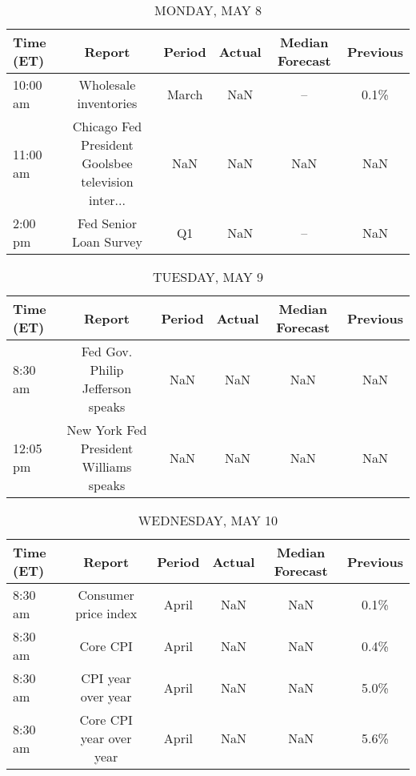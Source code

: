 \documentclass{article}%
\begin{document}
%
\normalsize%


\begin{table}[htbp]%
\caption{MONDAY, MAY 8}%
\centering%
\begin{adjustbox}{width=1\textwidth}%
\begin{tabular}{lccccc}
\toprule
Time (ET) &                                             Report & Period & Actual & Median Forecast & Previous \\
\midrule
 10:00 am &                              Wholesale inventories &  March &    NaN &              -- &     0.1\% \\
 11:00 am & Chicago Fed President Goolsbee television inter... &    NaN &    NaN &             NaN &      NaN \\
  2:00 pm &                             Fed Senior Loan Survey &     Q1 &    NaN &              -- &      NaN \\
\bottomrule
\end{tabular}
%
\end{adjustbox}%
\end{table}

%


\begin{table}[htbp]%
\caption{TUESDAY, MAY 9}%
\centering%
\begin{adjustbox}{width=1\textwidth}%
\begin{tabular}{lccccc}
\toprule
Time (ET) &                                 Report & Period & Actual & Median Forecast & Previous \\
\midrule
  8:30 am &       Fed Gov. Philip Jefferson speaks &    NaN &    NaN &             NaN &      NaN \\
 12:05 pm & New York Fed President Williams speaks &    NaN &    NaN &             NaN &      NaN \\
\bottomrule
\end{tabular}
%
\end{adjustbox}%
\end{table}

%


\begin{table}[htbp]%
\caption{WEDNESDAY, MAY 10}%
\centering%
\begin{adjustbox}{width=1\textwidth}%
\begin{tabular}{lccccc}
\toprule
Time (ET) &                  Report & Period & Actual & Median Forecast & Previous \\
\midrule
  8:30 am &    Consumer price index &  April &    NaN &             NaN &     0.1\% \\
  8:30 am &                Core CPI &  April &    NaN &             NaN &     0.4\% \\
  8:30 am &      CPI year over year &  April &    NaN &             NaN &     5.0\% \\
  8:30 am & Core CPI year over year &  April &    NaN &             NaN &     5.6\% \\
\bottomrule
\end{tabular}
%
\end{adjustbox}%
\end{table}
\end{document}
